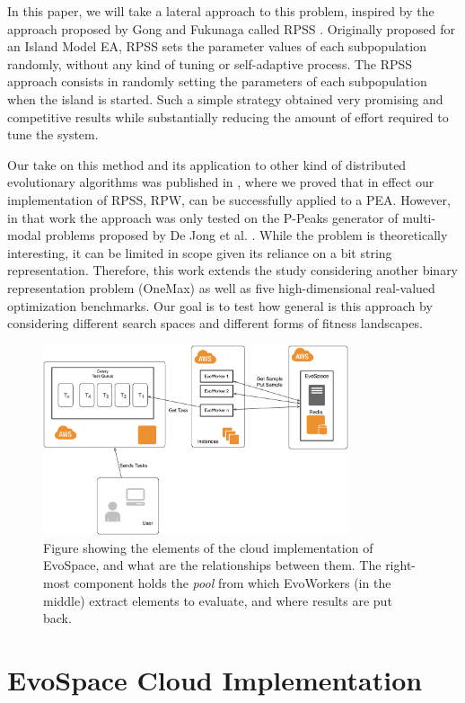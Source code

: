 \documentclass[conference]{IEEEtran}
\begin{document}
In this paper, we will take a lateral approach to this problem,
inspired by the approach proposed by Gong and Fukunaga called RPSS
\cite{fuku1,fuku2}.  Originally proposed for an Island Model EA, RPSS
sets the parameter values of each subpopulation randomly, without any
kind of tuning or self-adaptive process. The RPSS approach consists in
randomly setting the parameters of each subpopulation when the island
is started. Such a simple strategy obtained very promising and
competitive results while substantially reducing the amount of effort
required to tune the system.

Our take on this method and its application to other kind of
distributed evolutionary algorithms was published in \cite{LNCS86720702}, where we proved that in effect our
implementation of RPSS, RPW, 
can be successfully applied to a PEA. However, in that work the
approach was only tested on the P-Peaks generator of multi-modal problems proposed by De Jong et al. \cite{Jong:PS97}.
While the problem is theoretically interesting, it can be limited in scope given its reliance on a bit string representation.
Therefore, this work extends the study considering another binary representation problem (OneMax) as well as
five high-dimensional real-valued optimization benchmarks. Our goal is
to test how general is this approach by considering different search
spaces and different forms of fitness landscapes.

\begin{figure}[h!tbp]
    \centering
        \includegraphics[width=9cm]{img/EvoSpaceAWS.png}
    \caption{Figure showing the elements of the cloud implementation of EvoSpace, and what are the relationships between them. The right-most component holds the {\em pool} from which EvoWorkers (in the middle) extract elements to evaluate, and where results are put back.}
    \label{fig:evospace}
  \end{figure}
%
\section{EvoSpace Cloud Implementation}
\label{sec:evo}
\end{document}

